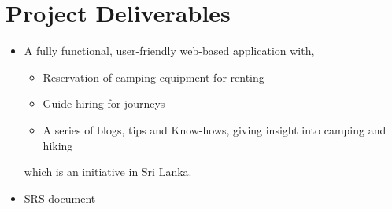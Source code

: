 \section{Project Deliverables}

\begin{itemize}
    \item A fully functional, user-friendly web-based application with,
        \begin{itemize}
            \item Reservation of camping equipment for renting 
            \item Guide hiring for journeys
            \item A series of blogs, tips and Know-hows, giving insight into camping and hiking
        \end{itemize}   
    which is an initiative in Sri Lanka.
    \item SRS document
\end{itemize}